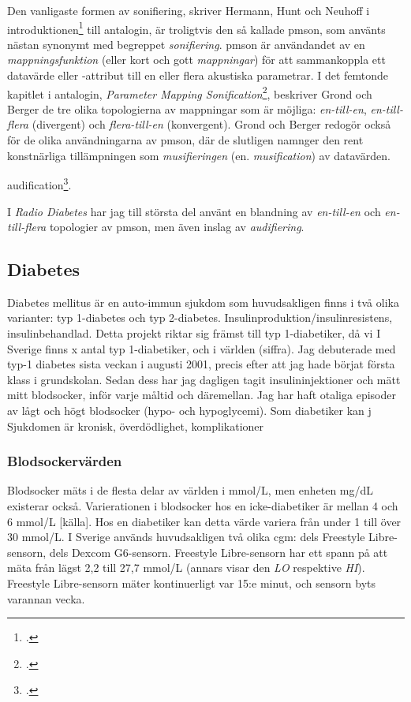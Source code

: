 \documentclass[11pt, a4paper]{article} %
\begin{document}
Den vanligaste formen av sonifiering, skriver Hermann, Hunt och Neuhoff i introduktionen\footcite[5]{hermann_introduction_2011} till antalogin, är troligtvis den så kallade \gls{pmson}, som använts nästan synonymt med begreppet \emph{sonifiering}. \gls{pmson} är användandet av en \emph{mappningsfunktion} (eller kort och gott \emph{mappningar}) för att sammankoppla ett datavärde eller -attribut till en eller flera akustiska parametrar. I det femtonde kapitlet i antalogin, \emph{Parameter Mapping Sonification}\footcite{hermann_parameter_2011}, beskriver Grond och Berger de tre olika topologierna av mappningar som är möjliga: \emph{en-till-en}, \emph{en-till-flera} (divergent) och \emph{flera-till-en} (konvergent). Grond och Berger redogör också för de olika användningarna av \gls{pmson}, där de slutligen namnger den rent konstnärliga tillämpningen som \emph{musifieringen} (en. \emph{musification}) av datavärden.

\gls{audification}\footcite[302]{hermann_audification_2011}.

I \emph{Radio Diabetes} har jag till största del använt en blandning av \emph{en-till-en} och \emph{en-till-flera} topologier av \gls{pmson}, men även inslag av \emph{audifiering}.


\subsection*{Diabetes}

Diabetes mellitus är en auto-immun sjukdom som huvudsakligen finns i två olika varianter: typ 1-diabetes och typ 2-diabetes. Insulinproduktion/insulinresistens, insulinbehandlad. Detta projekt riktar sig främst till typ 1-diabetiker, då vi  I Sverige finns x antal typ 1-diabetiker, och i världen (siffra). Jag debuterade med typ-1 diabetes sista veckan i augusti 2001, precis efter att jag hade börjat första klass i grundskolan. Sedan dess har jag dagligen tagit insulininjektioner och mätt mitt blodsocker, inför varje måltid och däremellan. Jag har haft otaliga episoder av lågt och högt blodsocker (hypo- och hypoglycemi). Som diabetiker kan j Sjukdomen är kronisk, överdödlighet, komplikationer


\subsubsection*{Blodsockervärden}
Blodsocker mäts i de flesta delar av världen i mmol/L, men enheten mg/dL existerar också. Varierationen i blodsocker hos en icke-diabetiker är mellan 4 och 6 mmol/L [källa]. Hos en diabetiker kan detta värde variera från under 1 till över 30 mmol/L. I Sverige används huvudsakligen två olika \gls{cgm}: dels Freestyle Libre-sensorn, dels Dexcom G6-sensorn. Freestyle Libre-sensorn har ett spann på att mäta från lägst 2,2 till 27,7 mmol/L (annars visar den \emph{LO} respektive \emph{HI}). Freestyle Libre-sensorn mäter kontinuerligt var 15:e minut, och sensorn byts varannan vecka.
\end{document}
